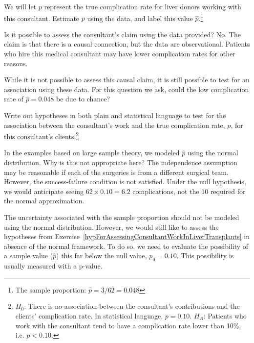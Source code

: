 \begin{exercise}
We will let $p$ represent the true complication rate for liver donors working with this consultant. Estimate $p$ using the data, and label this value $\hat{p}$.\footnote{The sample proportion: $\hat{p} = 3/62 = 0.048$}
\end{exercise}

\begin{example}{Is it possible to assess the consultant's claim using the data provided?}
No. The claim is that there is a causal connection, but the data are observational. Patients who hire this medical consultant may have lower complication rates for other reasons.

While it is not possible to assess this causal claim, it is still possible to test for an association using these data. For this question we ask, could the low complication rate of $\hat{p} = 0.048$ be due to chance?
\end{example}

\begin{exercise} \label{hypForAssessingConsultantWorkInLiverTransplants}
Write out hypotheses in both plain and statistical language to test for the association between the consultant's work and the true complication rate, $p$, for this consultant's clients.\footnote{$H_0$: There is no association between the consultant's contributions and the clients' complication rate. In statistical language, $p=0.10$. $H_A$: Patients who work with the consultant tend to have a complication rate lower than 10\%, i.e. $p<0.10$.}
\end{exercise}

\begin{example}{In the examples based on large sample theory, we modeled $\hat{p}$ using the normal distribution. Why is this not appropriate here?}
The independence assumption may be reasonable if each of the surgeries is from a different surgical team. However, the success-failure condition is not satisfied. Under the null hypothesis, we would anticipate seeing $62\times 0.10=6.2$ complications, not the 10 required for the normal approximation.
\end{example}

The uncertainty associated with the sample proportion should not be modeled using the normal distribution. However, we would still like to assess the hypotheses from Exercise~\ref{hypForAssessingConsultantWorkInLiverTransplants} in absence of the normal framework. To do so, we need to evaluate the possibility of a sample value ($\hat{p}$) this far below the null value, $p_0=0.10$. This possibility is usually measured with a p-value.

